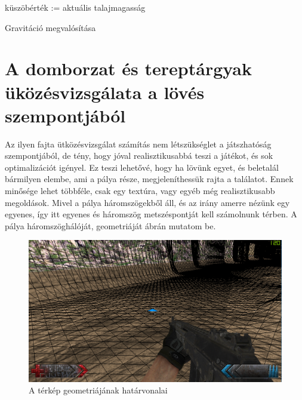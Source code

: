 \begin{algorithm}[H]
 küszöbérték := aktuális talajmagasság\;
 \caption{Gravitáció megvalósítása}
\end{algorithm} 
 
\section{A domborzat és tereptárgyak üközésvizsgálata a lövés szempontjából}

Az ilyen fajta ütközésvizsgálat számítás nem létszükséglet a játszhatóság szempontjából, de tény, hogy jóval realisztikusabbá teszi a játékot, és sok optimalizációt igényel. Ez teszi lehetővé, hogy ha lövünk egyet, és beletalál bármilyen elembe, ami a pálya része, megjeleníthessük rajta a találatot. Ennek minősége lehet többféle, csak egy textúra, vagy egyéb még realisztikusabb megoldások. Mivel a pálya háromszögekből áll, és az irány amerre nézünk egy egyenes, így itt egyenes és háromszög metszéspontját kell számolnunk térben. A pálya háromszöghálóját, geometriáját  ábrán mutatom be.

\begin{figure}[h]
\centering
\includegraphics[scale=0.4]{kepek/map_wireframe.png}
\caption{A térkép geometriájának határvonalai}
\label{fig:wireframe}
\end{figure}

